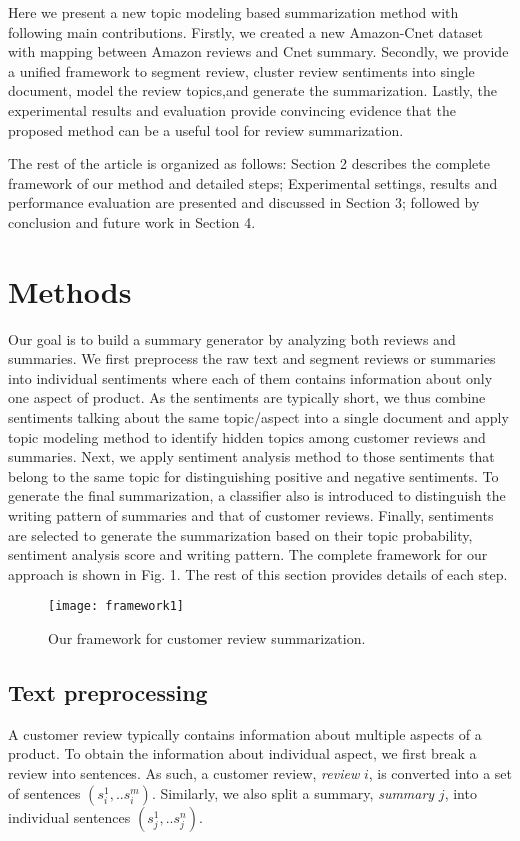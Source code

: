 \documentclass[letterpaper]{article}
\begin{document}
Here we present a new topic modeling based summarization method with following main contributions. Firstly, we created a new Amazon-Cnet dataset with mapping between Amazon reviews and Cnet summary. Secondly, we provide a unified framework to segment review, cluster review sentiments into single document, model the review topics,and generate the summarization. Lastly, the experimental results and evaluation provide convincing  evidence  that the proposed method can be a useful tool for review summarization.

The rest of the article is organized as follows: Section 2 describes the complete framework of our method and detailed steps; Experimental settings, results and performance evaluation are presented and discussed in Section 3; followed by conclusion and future work in Section 4.


\section{Methods}
Our goal is to build a summary generator by analyzing both reviews and summaries. We first preprocess the raw text and segment reviews or summaries into individual sentiments where each of them contains information about only one aspect of product. As the sentiments are typically short, we thus combine sentiments talking about the same topic/aspect into a single document and apply topic modeling method to identify hidden topics among customer reviews and summaries. Next, we apply sentiment analysis method to those sentiments that belong to the same topic for distinguishing positive and negative sentiments. To generate the final summarization, a classifier also is introduced to distinguish the writing pattern of summaries and that of customer reviews. Finally, sentiments are selected to generate the summarization based on their topic probability, sentiment analysis score and writing pattern. The complete framework for our approach is shown in Fig. 1. The rest of this section provides details of each step.

\begin{figure}[!t]
\texttt{[image: framework1]}
\caption{Our framework for customer review summarization.}
\label{framework}
\end{figure}

\subsection{Text preprocessing}
A customer review typically contains information about multiple aspects of a product.
To obtain the information about individual aspect, we first break a review into sentences. 
As such, a customer review, \textit{review} $i$, is converted into a set of sentences $(s_i^1, .. s_i^m)$.
Similarly, we also split a summary, \textit{summary} $j$, into individual sentences $(s_j^1, .. s_j^n)$.
\end{document}
